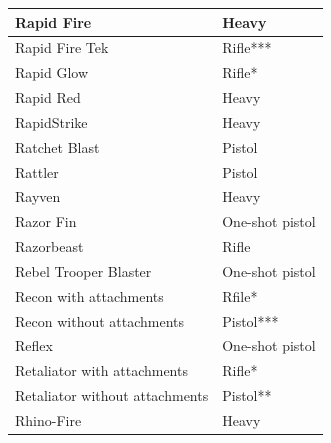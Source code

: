 \begin{table}
\begin{tabular}{|l|l|}
 \hline Rapid Fire & Heavy \\
 \hline Rapid Fire Tek & Rifle*** \\
 \hline Rapid Glow & Rifle* \\
 \hline Rapid Red & Heavy \\
 \hline RapidStrike & Heavy \\
 \hline Ratchet Blast & Pistol \\
 \hline Rattler & Pistol \\
 \hline Rayven & Heavy \\
 \hline Razor Fin & One-shot pistol \\
 \hline Razorbeast & Rifle \\
 \hline Rebel Trooper Blaster & One-shot pistol \\
 \hline Recon with attachments & Rfile* \\
 \hline Recon without attachments & Pistol*** \\
 \hline Reflex & One-shot pistol \\
 \hline Retaliator with attachments & Rifle* \\
 \hline Retaliator without attachments & Pistol** \\
 \hline Rhino-Fire & Heavy \\
 \hline \end{tabular}

\end{table}


